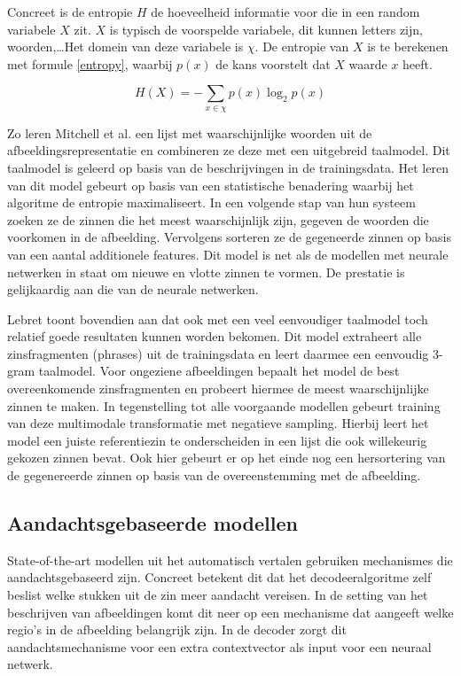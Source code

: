 Concreet is de entropie $H$ de hoeveelheid informatie voor die in een random variabele $X$ zit. $X$ is typisch de voorspelde variabele, dit kunnen letters zijn, woorden,\ldots Het domein van deze variabele is $\chi$. De entropie van $X$ is te berekenen met formule \eqref{entropy}, waarbij $p(x)$ de kans voorstelt dat $X$ waarde $x$ heeft\cite{Jurafsky:2009:SLP:1214993}.

\begin{equation}
     H(X) = -\sum_{x \in \chi}p(x)\log_2p(x)
     \label{entropy}
 \end{equation} 

Zo leren Mitchell et al.\cite{Mitchell2015} een lijst met waarschijnlijke woorden uit de afbeeldingsrepresentatie en combineren ze deze met een uitgebreid taalmodel. Dit taalmodel is geleerd op basis van de beschrijvingen in de trainingsdata. Het leren van dit model gebeurt op basis van een statistische benadering waarbij het algoritme de entropie maximaliseert. In een volgende stap van hun systeem zoeken ze de zinnen die het meest waarschijnlijk zijn, gegeven de woorden die voorkomen in de afbeelding. Vervolgens sorteren ze de gegeneerde zinnen op basis van een aantal additionele features. Dit model is net als de modellen met neurale netwerken in staat om nieuwe en vlotte zinnen te vormen. De prestatie is gelijkaardig aan die van de neurale netwerken.

Lebret\cite{Lebret2015} toont bovendien aan dat ook met een veel eenvoudiger taalmodel toch relatief goede resultaten kunnen worden bekomen. Dit model extraheert alle zinsfragmenten (phrases) uit de trainingsdata en leert daarmee een eenvoudig 3-gram taalmodel. Voor ongeziene afbeeldingen bepaalt het model de best overeenkomende zinsfragmenten en probeert hiermee de meest waarschijnlijke zinnen te maken. In tegenstelling tot alle voorgaande modellen gebeurt training van deze multimodale transformatie met negatieve sampling. Hierbij leert het model een juiste referentiezin te onderscheiden in een lijst die ook willekeurig gekozen zinnen bevat. Ook hier gebeurt er op het einde nog een hersortering van de gegenereerde zinnen op basis van de overeenstemming met de afbeelding.

\subsection{Aandachtsgebaseerde modellen}
State-of-the-art modellen uit het automatisch vertalen gebruiken mechanismes die aandachtsgebaseerd zijn. Concreet betekent dit dat het decodeeralgoritme zelf beslist welke stukken uit de zin meer aandacht vereisen.
In de setting van het beschrijven van afbeeldingen komt dit neer op een mechanisme dat aangeeft welke regio's in de afbeelding belangrijk zijn. In de decoder zorgt dit aandachtsmechanisme voor een extra contextvector als input voor een neuraal netwerk. 


